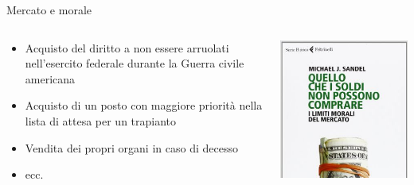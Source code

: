 \documentclass[aspectratio=64,11pt]{beamer}
\begin{document}
\begin{frame}{Mercato e morale}
\begin{columns}
\begin{column}{.6\columnwidth}
\begin{itemize}
\item Acquisto del diritto a non essere arruolati nell’esercito federale durante
la Guerra civile americana
\item Acquisto di un posto con maggiore priorità nella lista di attesa per un
trapianto
\item Vendita dei propri organi in caso di decesso
\item ecc.
\end{itemize}
\end{column}

\begin{column}{.4\columnwidth}
\begin{center}
\includegraphics[width=\textwidth]{./figure/Sandel-limiti-morali.jpeg}
\end{center}
\end{column}
\end{columns}
\end{frame}
\end{document}
